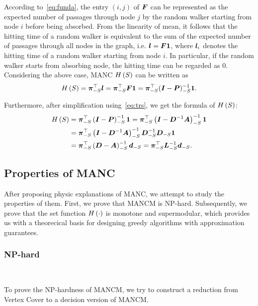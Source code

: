 \documentclass[sigconf]{acmart}
\begin{document}
According to~\eqref{eq:funda}, the entry \((i,j)\) of \(\boldsymbol{F}\) can be represented as the expected number of passages through node \(j\) by the random walker starting from node \(i\) before being absorbed.
From the linearity of mean, it follows that the hitting time of a random walker is equivalent to the sum of the expected number of passages through all nodes in the graph, i.e. \(\boldsymbol{l}=\boldsymbol{F}\boldsymbol{1}\), where \(\boldsymbol{l}_i\) denotes the hitting time of a random walker starting from node \(i\).
In particular, if the random walker starts from absorbing node, the hitting time can be regarded as \(0\).
Considering the above case, MANC \(H\left(S\right)\) can be written as
\[H\left(S\right)=\boldsymbol{\pi}_{-S}^\top\boldsymbol{l}=\boldsymbol{\pi}_{-S}^\top\boldsymbol{F}\boldsymbol{1}=\boldsymbol{\pi}_{-S}^\top(\boldsymbol{I}-\boldsymbol{P})_{-S}^{-1}\boldsymbol{1}.\]

Furthermore, after simplification using~\eqref{eq:trs}, we get the formula of \(H\left(S\right)\):
\begin{equation}\label{eq:MANC}
    \begin{split}
        H\left(S\right) & =\boldsymbol{\pi}_{-S}^\top\left( \boldsymbol{I}-\boldsymbol{P} \right)_{-S}^{-1}\boldsymbol{1}=\boldsymbol{\pi}_{-S}^\top\left( \boldsymbol{I}-\boldsymbol{D}^{-1}\boldsymbol{A} \right)_{-S}^{-1}\boldsymbol{1}                          \\
        & =\boldsymbol{\pi}_{-S}^\top\left( \boldsymbol{I}-\boldsymbol{D}^{-1}\boldsymbol{A} \right)_{-S}^{-1}\boldsymbol{D}_{-S}^{-1}\boldsymbol{D}_{-S}\boldsymbol{1} \\
        & =\boldsymbol{\pi}_{-S}^\top\left( \boldsymbol{D}-\boldsymbol{A} \right)_{-S}^{-1}\boldsymbol{d}_{-S}=\boldsymbol{\pi}_{-S}^\top\boldsymbol{L}_{-S}^{-1}\boldsymbol{d}_{-S}.
    \end{split}
\end{equation}

\subsection{Properties of MANC}

After proposing physic explanations of MANC, we attempt to study the properties of them. First, we prove that MANCM is NP-hard.
Subsequently, we prove that the set function \(H\left(\cdot\right)\) is monotone and supermodular, which provides us with a theorecical basis for designing greedy algorithms with approximation guarantees.

\subsubsection{NP-hard}

\

To prove the NP-hardness of MANCM, we try to construct a reduction from Vertex Cover to a decision version of MANCM.
\end{document}

